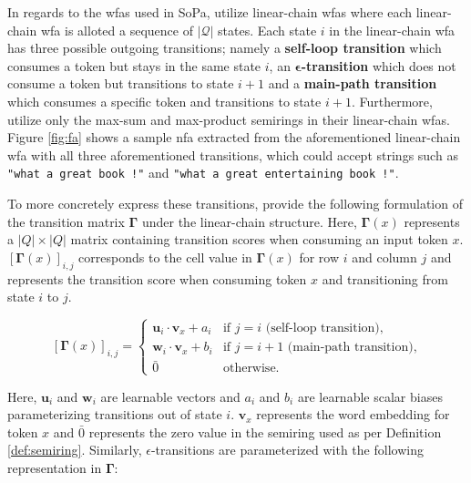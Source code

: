 In regards to the \ac{wfas} used in SoPa, \citet{schwartz2018sopa} utilize
linear-chain \ac{wfas} where each linear-chain \ac{wfa} is alloted a sequence of
$|\mathcal{Q}|$ states. Each state $i$ in the linear-chain \ac{wfa} has three
possible outgoing transitions; namely a \textbf{self-loop transition} which
consumes a token but stays in the same state $i$, an
\textbf{$\bm{\epsilon}$-transition} which does not consume a token but transitions to
state $i+1$ and a \textbf{main-path transition} which consumes a specific token
and transitions to state $i+1$. Furthermore, \citet{schwartz2018sopa} utilize
only the max-sum and max-product semirings in their linear-chain \ac{wfas}. Figure
\ref{fig:fa} shows a sample \ac{nfa} extracted from the aforementioned linear-chain
\ac{wfa} with all three aforementioned transitions, which could accept
strings such as \texttt{"what a great book !"} and \texttt{"what a great
  entertaining book !"}.

To more concretely express these transitions, \citet{schwartz2018sopa} provide
the following formulation of the transition matrix $\bm{\Gamma}$ under the
linear-chain structure. Here, $\bm{\Gamma}(x)$ represents a $|Q|\times|Q|$ matrix
containing transition scores when consuming an input token $x$. $[\bm{\Gamma}(x)]_{i,j}$
corresponds to the cell value in $\bm{\Gamma}(x)$ for row $i$ and column
$j$ and represents the transition score when consuming token $x$ and
transitioning from state $i$ to $j$.

\begin{equation}
  \label{eq:sopa_transition_matrix_main}
  [\bm{\Gamma}(x)]_{i,j} =
  \begin{cases}
    \bm{u}_i \cdot \bm{v}_x + a_i  & \text{if } j = i \text{ (self-loop transition),} \\
    \bm{w}_i \cdot \bm{v}_x + b_i  & \text{if } j = i + 1 \text{ (main-path transition),} \\
    \bar{0} & \text{otherwise.}
  \end{cases}
\end{equation}

Here, $\bm{u}_i$ and $\bm{w}_i$ are learnable vectors and $a_i$ and $b_i$ are
learnable scalar biases parameterizing transitions out of state $i$. $\bm{v}_x$
represents the word embedding for token $x$ and $\bar{0}$ represents the zero
value in the semiring used as per Definition \ref{def:semiring}. Similarly,
$\epsilon$-transitions are parameterized with the following representation in
$\bm{\Gamma}$:

